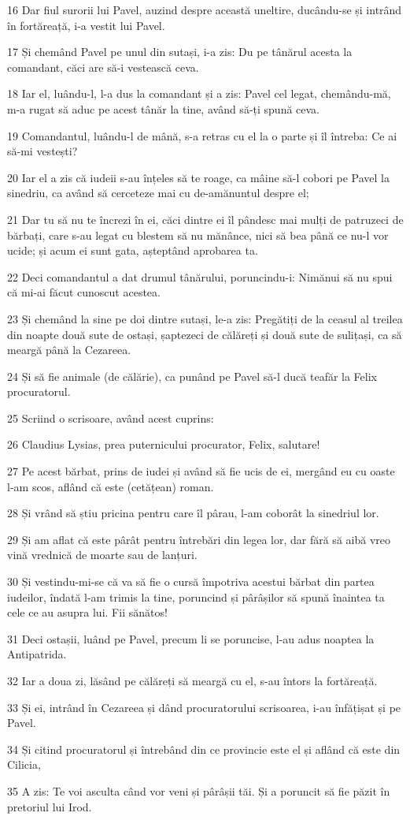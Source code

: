 \par 16 Dar fiul surorii lui Pavel, auzind despre această uneltire, ducându-se și intrând în fortăreață, i-a vestit lui Pavel.
\par 17 Și chemând Pavel pe unul din sutași, i-a zis: Du pe tânărul acesta la comandant, căci are să-i vestească ceva.
\par 18 Iar el, luându-l, l-a dus la comandant și a zis: Pavel cel legat, chemându-mă, m-a rugat să aduc pe acest tânăr la tine, având să-ți spună ceva.
\par 19 Comandantul, luându-l de mână, s-a retras cu el la o parte și îl întreba: Ce ai să-mi vestești?
\par 20 Iar el a zis că iudeii s-au înțeles să te roage, ca mâine să-l cobori pe Pavel la sinedriu, ca având să cerceteze mai cu de-amănuntul despre el;
\par 21 Dar tu să nu te încrezi în ei, căci dintre ei îl pândesc mai mulți de patruzeci de bărbați, care s-au legat cu blestem să nu mănânce, nici să bea până ce nu-l vor ucide; și acum ei sunt gata, așteptând aprobarea ta.
\par 22 Deci comandantul a dat drumul tânărului, poruncindu-i: Nimănui să nu spui că mi-ai făcut cunoscut acestea.
\par 23 Și chemând la sine pe doi dintre sutași, le-a zis: Pregătiți de la ceasul al treilea din noapte două sute de ostași, șaptezeci de călăreți și două sute de sulițași, ca să meargă până la Cezareea.
\par 24 Și să fie animale (de călărie), ca punând pe Pavel să-l ducă teafăr la Felix procuratorul.
\par 25 Scriind o scrisoare, având acest cuprins:
\par 26 Claudius Lysias, prea puternicului procurator, Felix, salutare!
\par 27 Pe acest bărbat, prins de iudei și având să fie ucis de ei, mergând eu cu oaste l-am scos, aflând că este (cetățean) roman.
\par 28 Și vrând să știu pricina pentru care îl pârau, l-am coborât la sinedriul lor.
\par 29 Și am aflat că este pârât pentru întrebări din legea lor, dar fără să aibă vreo vină vrednică de moarte sau de lanțuri.
\par 30 Și vestindu-mi-se că va să fie o cursă împotriva acestui bărbat din partea iudeilor, îndată l-am trimis la tine, poruncind și pârâșilor să spună înaintea ta cele ce au asupra lui. Fii sănătos!
\par 31 Deci ostașii, luând pe Pavel, precum li se poruncise, l-au adus noaptea la Antipatrida.
\par 32 Iar a doua zi, lăsând pe călăreți să meargă cu el, s-au întors la fortăreață.
\par 33 Și ei, intrând în Cezareea și dând procuratorului scrisoarea, i-au înfățișat și pe Pavel.
\par 34 Și citind procuratorul și întrebând din ce provincie este el și aflând că este din Cilicia,
\par 35 A zis: Te voi asculta când vor veni și pârâșii tăi. Și a poruncit să fie păzit în pretoriul lui Irod.

